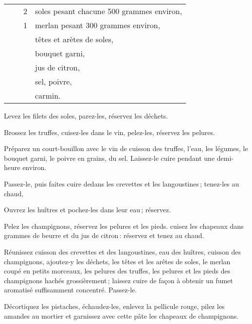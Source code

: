 \begin{longtable}{rrrp{16em}}
        &         &  2 & soles pesant chacune 500 grammes environ,                                        \\
        &         &  1 & merlan pesant 300 grammes environ,                                               \\
        &         &    & têtes et arètes de soles,                                                        \\
        &         &    & bouquet garni,                                                                   \\
        &         &    & jus de citron,                                                                   \\
        &         &    & sel, poivre,                                                                     \\
        &         &    & carmin.                                                                          \\
\end{longtable}
\normalsize

Levez les filets des soles, parez-les, réservez les déchets.

Brossez les truffes, cuisez-les dans le vin, pelez-les, réservez les pelures.

Préparez un court-bouillon avec le vin de cuisson des truffes, l'eau, les
légumes, le bouquet garni, le poivre en grains, du sel. Laissez-le cuire
pendant une demi-heure environ.

Passez-le, puis faites cuire dedans les crevettes et les langoustines ;
tenez-les au chaud,

Ouvrez les huîtres et pochez-les dans leur eau ; réservez.

Pelez les champignons, réservez les pelures et les pieds. cuisez les chapeaux
dans {\mmm} grammes de beurre et du jus de citron : réservez et tenez au chaud.

Réunissez cuisson des crevettes et des langoustines, eau des huîtres, cuisson
des champignons, ajoutez-y les déchets, les têtes et les arêtes de soles, le
merlan coupé en petits morceaux, les pelures des truffes, les pelures et les
pieds des champignons hachés grossièrement ; laissez cuire de façon à obtenir
un fumet aromatisé suffisamment concentré. Passez-le.

Décortiquez les pistaches, échaudez-les, enlevez la pellicule rouge, pilez les
amandes au mortier et garnissez avec cette pâte les chapeaux de champignons.

